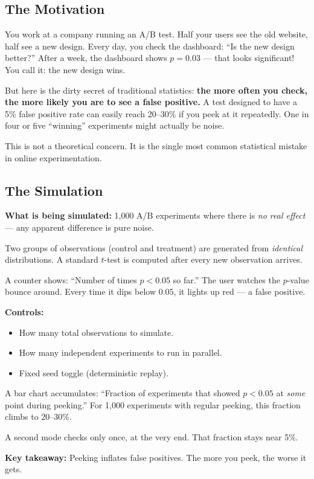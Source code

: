 \documentclass[12pt, a4paper]{article}
\begin{document}
\subsection{The Motivation}

\begin{intuition}
You work at a company running an A/B test.  Half your users see the old
website, half see a new design.  Every day, you check the dashboard:
``Is the new design better?''  After a week, the dashboard shows $p=0.03$ ---
that looks significant!  You call it: the new design wins.

But here is the dirty secret of traditional statistics: \textbf{the more often
you check, the more likely you are to see a false positive.}  A test designed
to have a 5\% false positive rate can easily reach 20--30\% if you peek at it
repeatedly.  One in four or five ``winning'' experiments might actually be
noise.

This is not a theoretical concern.  It is the single most common statistical
mistake in online experimentation.
\end{intuition}

\subsection{The Simulation}

\begin{simulation}
\textbf{What is being simulated:}
1,000 A/B experiments where there is \emph{no real effect} --- any apparent
difference is pure noise.

Two groups of observations (control and treatment) are generated from
\emph{identical} distributions.  A standard $t$-test is computed after every
new observation arrives.

A counter shows: ``Number of times $p<0.05$ so far.''  The user watches the
$p$-value bounce around.  Every time it dips below $0.05$, it lights up red
--- a false positive.

\textbf{Controls:}
\begin{itemize}[nosep]
  \item How many total observations to simulate.
  \item How many independent experiments to run in parallel.
  \item Fixed seed toggle (deterministic replay).
\end{itemize}

A bar chart accumulates: ``Fraction of experiments that showed $p<0.05$ at
\emph{some} point during peeking.''  For 1,000 experiments with regular
peeking, this fraction climbs to 20--30\%.

A second mode checks only once, at the very end.  That fraction stays near
5\%.

\textbf{Key takeaway:}
Peeking inflates false positives.  The more you peek, the worse it gets.
\end{simulation}
\end{document}

